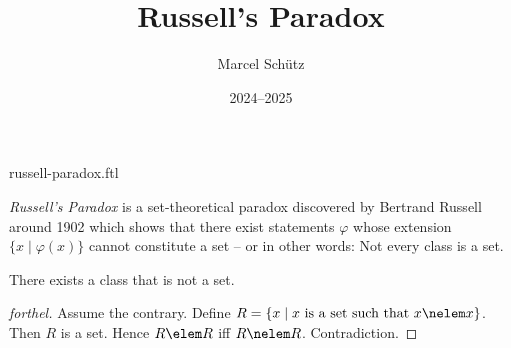 \documentclass{article}
\title{Russell's Paradox}
\author{Marcel Schütz}
\date{2024--2025}
\begin{document}
\begin{smodule}{russell-paradox.ftl}
\maketitle


\noindent \emph{Russell's Paradox} is a set-theoretical paradox discovered by
Bertrand Russell around 1902 \cite[chapter XV]{Frege1980} which shows that 
there exist statements $\varphi$ whose extension
$\{x\mid\varphi(x)\}$ cannot constitute a set -- or in other words:
Not every class is a set.

\begin{forthel}
  \begin{theorem}[title=Russell's Paradox]
    There exists a class that is not a set.
  \end{theorem}
  \begin{proof}[forthel]
    Assume the contrary.
    Define $R = \{x \mid x \text{ is a set such that } x \nelem x\}$.
    Then $R$ is a set.
    Hence $R \elem R$ iff $R \nelem R$.
    Contradiction.
  \end{proof}
\end{forthel}

\printbibliography
{}
\end{smodule}
\end{document}
